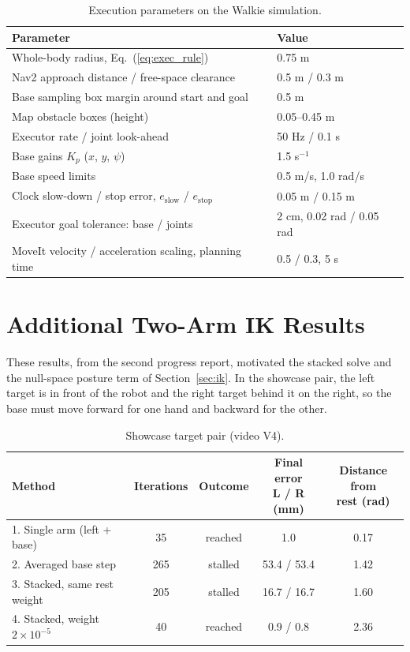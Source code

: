 \begin{table}[H]
    \centering
    \small
    \begin{tabular}{ll}
        \toprule
        Parameter & Value \\
        \midrule
        Whole-body radius, Eq.~(\ref{eq:exec_rule}) & 0.75 m \\
        Nav2 approach distance / free-space clearance & 0.5 m / 0.3 m \\
        Base sampling box margin around start and goal & 0.5 m \\
        Map obstacle boxes (height) & 0.05--0.45 m \\
        Executor rate / joint look-ahead & 50 Hz / 0.1 s \\
        Base gains $K_p$ ($x$, $y$, $\psi$) & 1.5 s$^{-1}$ \\
        Base speed limits & 0.5 m/s, 1.0 rad/s \\
        Clock slow-down / stop error, $e_{\mathrm{slow}}$ / $e_{\mathrm{stop}}$ & 0.05 m / 0.15 m \\
        Executor goal tolerance: base / joints & 2 cm, 0.02 rad / 0.05 rad \\
        MoveIt velocity / acceleration scaling, planning time & 0.5 / 0.3, 5 s \\
        \bottomrule
    \end{tabular}
    \caption{\small{Execution parameters on the Walkie simulation.}}
    \label{tab:app_exec_params}
\end{table}

\section{Additional Two-Arm IK Results}
\label{app:bimanual}

These results, from the second progress report, motivated the stacked solve and the null-space
posture term of Section~\ref{sec:ik}. In the showcase pair, the left target is in front of the robot
and the right target behind it on the right, so the base must move forward for one hand and backward
for the other.

\begin{table}[H]
    \centering
    \small
    \begin{tabular}{lcccc}
        \toprule
        Method & Iterations & Outcome & \shortstack{Final error\\L / R (mm)} & \shortstack{Distance from\\rest (rad)} \\
        \midrule
        1. Single arm (left + base) & 35 & reached & 1.0 & 0.17 \\
        2. Averaged base step & 265 & stalled & 53.4 / 53.4 & 1.42 \\
        3. Stacked, same rest weight & 205 & stalled & 16.7 / 16.7 & 1.60 \\
        4. Stacked, weight $2\times10^{-5}$ & 40 & reached & 0.9 / 0.8 & 2.36 \\
        \bottomrule
    \end{tabular}
    \caption{\small{Showcase target pair (video V4).}}
    \label{tab:app_showcase}
\end{table}

